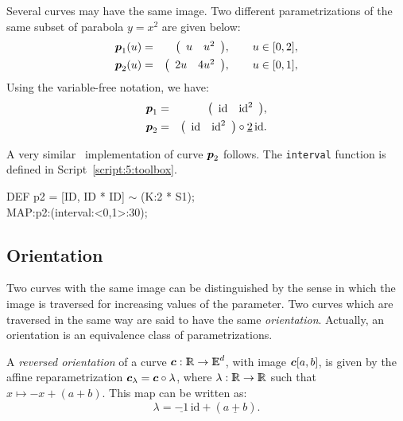 \documentclass{31x47jw}
\begin{document}
\begin{example}
\label{ex:parabola}
Several curves may have the same image.  Two different
parametrizations of the same subset of parabola $y = x^2$ are given
below:
\begin{eqnarray*}
{\mbox{\boldmath $p$}}_1(u) &=&  {\left(\begin{array}{cccccccc}u & u^2\end{array}\right)}, \qquad u\in[0,2], \\
{\mbox{\boldmath $p$}}_2(u) &=&  {\left(\begin{array}{cccccccc}2u & 4u^2\end{array}\right)}, \qquad u\in[0,1], \\
\end{eqnarray*}
Using the variable-free notation, we have:
\begin{eqnarray*}
\p{p}_1 &=&  \vet{\textrm{id} & \textrm{id}^2}, \\
\p{p}_2 &=&  \vet{\textrm{id} & \textrm{id}^2}
\circ \underline{2} \,\textrm{id}. %
\end{eqnarray*}

A very similar \pl\ implementation of curve ${\mbox{\boldmath $p$}}_2$ follows.  The
\texttt{interval} function is defined in Script~\ref{script:5:toolbox}.

\begin{script} [Parabola]
\begin{smallplasm}
DEF p2 = [ID, ID * ID] $\sim$ (K:2 * S1);\\[0.3cm]
MAP:p2:(interval:<0,1>:30);
\end{smallplasm}
\label{script:parabola}
\end{script}

\end{example}

\subsection{Orientation}
\label{subsec:5:orientation}

Two curves with the same image can be distinguished by the sense in 
which the image is traversed for increasing values of the parameter. Two 
curves which are traversed in the same way are said to have the same 
\emph{orientation}. Actually, an orientation is an equivalence class 
of parametrizations.

A \emph{reversed orientation} of a curve ${\mbox{\boldmath $c$}}:\mathbb{I\!\!R}\rightarrow
\mathbb{I\!\!E}^{d}$, with image ${\mbox{\boldmath $c$}}[a,b]$, is given by the affine
reparametrization ${\mbox{\boldmath $c$}}_{\lambda}={\mbox{\boldmath $c$}}\circ\lambda$, where
${\lambda}:\mathbb{I\!\!R}\rightarrow\mathbb{I\!\!R}$ such that $x\mapsto-x+(a+b)$.  This map
can be written as:
\[
\lambda = \underline{-1}\, \textrm{id} + (\underline{a+b}).
\]
\end{document}
